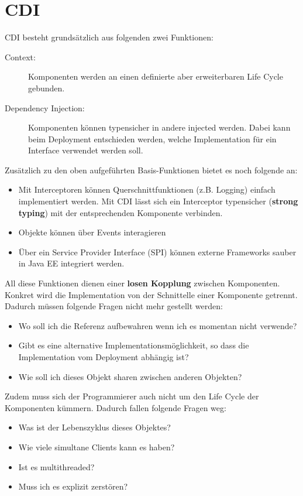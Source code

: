 \section{CDI}

CDI besteht grundsätzlich aus folgenden zwei Funktionen:
\begin{description}
	\item[Context:] Komponenten werden an einen definierte aber erweiterbaren Life Cycle gebunden.
	\item[Dependency Injection:] Komponenten können typensicher in andere injected werden. Dabei kann beim Deployment entschieden werden, welche Implementation für ein Interface verwendet werden soll.
\end{description}
Zusätzlich zu den oben aufgeführten Basis-Funktionen bietet es noch folgende an:
\begin{itemize}
	\item Mit Interceptoren können Querschnittfunktionen (z.B. Logging) einfach implementiert werden. Mit CDI lässt sich ein Interceptor typensicher (\textbf{strong typing}) mit der entsprechenden Komponente verbinden.
	\item Objekte können über Events interagieren
	\item Über ein Service Provider Interface (SPI) können externe Frameworks sauber in Java EE integriert werden.
\end{itemize}
All diese Funktionen dienen einer \textbf{losen Kopplung} zwischen Komponenten. Konkret wird die Implementation von der Schnittelle einer Komponente getrennt. Dadurch müssen folgende Fragen nicht mehr gestellt werden:
\begin{itemize}
	\item Wo soll ich die Referenz aufbewahren wenn ich es momentan nicht verwende?
	\item Gibt es eine alternative Implementationsmöglichkeit, so dass die Implementation vom Deployment abhängig ist?
	\item Wie soll ich dieses Objekt sharen zwischen anderen Objekten?
\end{itemize}
Zudem muss sich der Programmierer auch nicht um den Life Cycle der Komponenten kümmern. Dadurch fallen folgende Fragen weg:
\begin{itemize}
	\item Was ist der Lebenszyklus dieses Objektes?
	\item Wie viele simultane Clients kann es haben?
	\item Ist es multithreaded?
	\item Muss ich es explizit zerstören?
\end{itemize}

